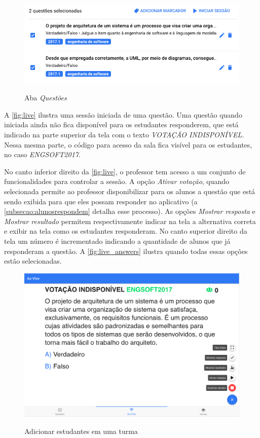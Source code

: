 \begin{figure}[ht]
  \centering
  \caption{Aba \textit{Questões}}
  \includegraphics[scale=.50]{imagens/telas/session_details}
  \doautor
  \label{fig:session_details}
\end{figure}

A \autoref{fig:live} ilustra uma sessão iniciada de uma questão. Uma questão quando
iniciada ainda não fica disponível para os estudantes responderem, que está indicado
na parte superior da tela com o texto \textit{VOTAÇÃO INDISPONÍVEL}. Nessa mesma parte,
o código para acesso da sala fica visível para os estudantes, no caso \textit{ENGSOFT2017}.

No canto inferior direito da \autoref{fig:live}, o professor tem acesso a um conjunto de
funcionalidades para controlar a sessão. A opção \textit{Ativar votação}, quando selecionada
permite ao professor disponibilizar para os alunos a questão que está sendo exibida para que
eles possam responder no aplicativo (a \autoref{subsecao:alunosrespondem} detalha esse processo).
As opções \textit{Mostrar resposta} e \textit{Mostrar resultado} permitem respectivamente indicar
na tela a alternativa correta e exibir na tela como os estudantes responderam.
No canto superior direito da tela um número é incrementado indicando a quantidade de
alunos que já responderam a questão. A \autoref{fig:live_answers} ilustra quando
todas essas opções estão selecionadas.

\begin{figure}[ht]
  \centering
  \caption{Adicionar estudantes em uma turma}
  \includegraphics[scale=.4]{imagens/telas/live}
  \doautor
  \label{fig:live}
\end{figure}

